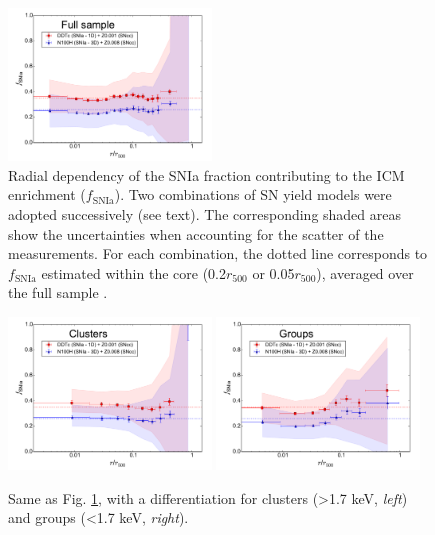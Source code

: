 \documentclass{aa}
\begin{document}
\begin{figure}[!]

                \includegraphics[width=0.48\textwidth]{fig_SNe_ratios.pdf}

        \caption{Radial dependency of the SNIa fraction contributing to the ICM enrichment ($f_\text{SNIa}$). Two combinations of SN yield models were adopted successively (see text). The corresponding shaded areas show the uncertainties when accounting for the scatter of the measurements. For each combination, the dotted line corresponds to $f_\text{SNIa}$ estimated within the core (0.2$r_{500}$ or 0.05$r_{500}$), averaged over the full sample \citep[see][]{2016A&A...595A.126M}.}
\label{fig:SNe_ratios}
\end{figure}





\begin{figure}[!]

                \includegraphics[width=0.48\textwidth]{fig_SNe_ratios_cl.pdf}
                \includegraphics[width=0.48\textwidth]{fig_SNe_ratios_gr.pdf}

        \caption{Same as Fig. \ref{fig:SNe_ratios}, with a differentiation for clusters (>1.7 keV, \textit{left}) and groups (<1.7 keV, \textit{right}).}
\label{fig:SNe_ratios_clgr}
\end{figure}
\end{document}
